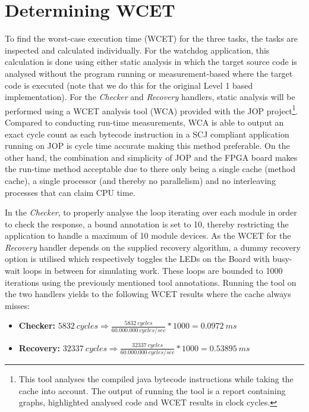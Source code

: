 \section{Determining WCET} %
\label{sec:determining_wcet}
To find the worst-case execution time (WCET) for the three tasks, the tasks are inspected and calculated individually. For the watchdog application, this calculation is done using either static analysis in which the target source code is analysed without the program running or measurement-based where the target code is executed (note that we do this for the original Level 1 based implementation). For the \textit{Checker} and \textit{Recovery} handlers, static analysis will be performed using a WCET analysis tool (WCA) provided with the JOP project\footnote{This tool analyses the compiled java bytecode instructions while taking the cache into account. The output of running the tool is a report containing graphs, highlighted analysed code and WCET results in clock cycles.}. Compared to conducting run-time measurements, WCA is able to output an exact cycle count as each bytecode instruction in a SCJ compliant application running on JOP is cycle time accurate making this method preferable. On the other hand, the combination and simplicity of JOP and the FPGA board makes the run-time method acceptable due to there only being a single cache (method cache), a single processor (and thereby no parallelism) and no interleaving processes that can claim CPU time.

In the \textit{Checker}, to properly analyse the loop iterating over each module in order to check the response, a bound annotation is set to 10, thereby restricting the application to handle a maximum of 10 module devices. As the WCET for the \textit{Recovery} handler depends on the supplied recovery algorithm, a dummy recovery option is utilised which respectively toggles the LEDs on the Board with busy-wait loops in between for simulating work. These loops are bounded to 1000 iterations using the previously mentioned tool annotations. Running the tool on the two handlers yields to the following WCET results where the cache always misses:
\begin{itemize}
    \item \textbf{Checker:} $5832\ cycles \Rightarrow \frac{5832\ cycles}{60.000.000\ cycles/sec} * 1000 = 0.0972\ ms$
    \item \textbf{Recovery:} $32337\ cycles \Rightarrow \frac{32337\ cycles}{60.000.000\ cycles/sec} * 1000 = 0.53895\ ms$
\end{itemize}

